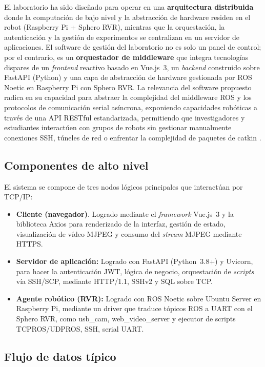 \documentclass[12pt]{article}
\numberwithin{figure}{section}
\numberwithin{table}{section}
\def\code#1{#1}%
\newcommand{\code}[1]{\textcolor{codeblue}{\url{#1}}}
\begin{document}
El laboratorio ha sido diseñado para operar en una \textbf{arquitectura distribuida} donde la computación de bajo nivel y la abstracción de hardware residen en el robot (Raspberry Pi + Sphero RVR), mientras que la orquestación, la autenticación y la gestión de experimentos se centralizan en un servidor de aplicaciones. El software de gestión del laboratorio no es solo un panel de control; por el contrario, es un \textbf{orquestador de middleware} \cite{IBM_WhatIs_Middleware} que integra tecnologías dispares de un \textit{frontend} reactivo basado en Vue.js~3, un \textit{backend} construido sobre FastAPI (Python) y una capa de abstracción de hardware gestionada por ROS Noetic en Raspberry Pi con Sphero RVR. La relevancia del software propuesto radica en su capacidad para abstraer la complejidad del middleware ROS y los protocolos de comunicación serial asíncrona, exponiendo capacidades robóticas a través de una API RESTful estandarizada, permitiendo que investigadores y estudiantes interactúen con grupos de robots sin gestionar manualmente conexiones SSH, túneles de red o enfrentar la complejidad de paquetes de catkin \cite{ROSWebsite}.


\subsection{Componentes de alto nivel}

El sistema se compone de tres nodos lógicos principales que interactúan por TCP/IP:

\begin{itemize}
    \item \textbf{Cliente (navegador)}.  Logrado mediante el \textit{framework} Vue.js~3 y la biblioteca Axios para renderizado de la interfaz, gestión de estado, visualización de vídeo MJPEG y consumo del \textit{stream} MJPEG mediante HTTPS.
    \item \textbf{Servidor de aplicación:} Logrado con FastAPI (Python~3.8+) y Uvicorn, para hacer la autenticación JWT, lógica de negocio, orquestación de \textit{scripts} vía SSH/SCP, mediante HTTP/1.1, SSHv2 y SQL sobre TCP.
    \item \textbf{Agente robótico (RVR):} Logrado con ROS Noetic sobre Ubuntu Server en Raspberry Pi, mediante un driver que traduce tópicos ROS a UART con el Sphero RVR, como \code{usb\_cam}, \code{web\_video\_server} y ejecutor de scripts TCPROS/UDPROS, SSH, serial UART.
\end{itemize}


\subsection{Flujo de datos típico}
\end{document}
